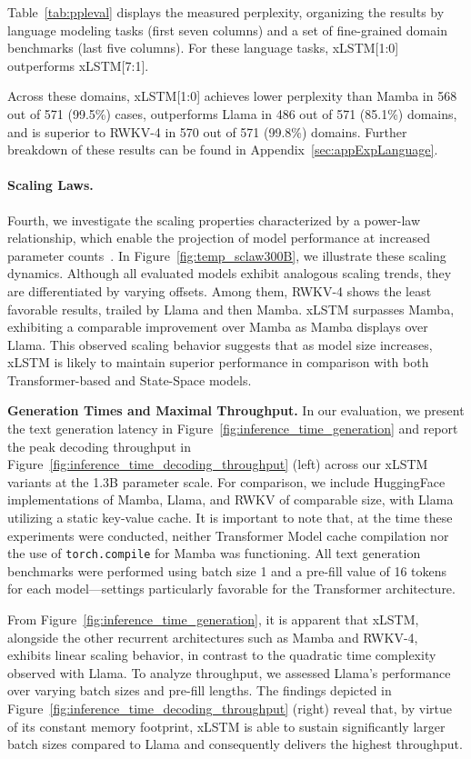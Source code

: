 Table~\ref{tab:ppleval} displays the measured perplexity, organizing the results by language modeling tasks (first seven columns) and a set of fine-grained domain benchmarks (last five columns). For these language tasks, xLSTM[1:0] outperforms xLSTM[7:1]. 

Across these domains, xLSTM[1:0] achieves lower perplexity than Mamba in 568 out of 571 (99.5\%) cases, outperforms Llama in 486 out of 571 (85.1\%) domains, and is superior to RWKV-4 in 570 out of 571 (99.8\%) domains. Further breakdown of these results can be found in Appendix~\ref{sec:appExpLanguage}.

\paragraph{Scaling Laws.} Fourth, we investigate the scaling properties characterized by a power-law relationship, which enable the projection of model performance at increased parameter counts~\citep{Kaplan:20,Brown:20short}. In Figure~\ref{fig:temp_sclaw300B}, we illustrate these scaling dynamics. Although all evaluated models exhibit analogous scaling trends, they are differentiated by varying offsets. Among them, RWKV-4 shows the least favorable results, trailed by Llama and then Mamba. xLSTM surpasses Mamba, exhibiting a comparable improvement over Mamba as Mamba displays over Llama. This observed scaling behavior suggests that as model size increases, xLSTM is likely to maintain superior performance in comparison with both Transformer-based and State-Space models.

\textbf{Generation Times and Maximal Throughput.} In our evaluation, we present the text generation latency in Figure~\ref{fig:inference_time_generation} and report the peak decoding throughput in Figure~\ref{fig:inference_time_decoding_throughput} (left) across our xLSTM variants at the 1.3B parameter scale. For comparison, we include HuggingFace implementations of Mamba, Llama, and RWKV of comparable size, with Llama utilizing a static key-value cache. It is important to note that, at the time these experiments were conducted, neither Transformer Model cache compilation nor the use of \texttt{torch.compile} for Mamba was functioning. All text generation benchmarks were performed using batch size 1 and a pre-fill value of 16 tokens for each model—settings particularly favorable for the Transformer architecture.

From Figure~\ref{fig:inference_time_generation}, it is apparent that xLSTM, alongside the other recurrent architectures such as Mamba and RWKV-4, exhibits linear scaling behavior, in contrast to the quadratic time complexity observed with Llama. To analyze throughput, we assessed Llama's performance over varying batch sizes and pre-fill lengths. The findings depicted in Figure~\ref{fig:inference_time_decoding_throughput} (right) reveal that, by virtue of its constant memory footprint, xLSTM is able to sustain significantly larger batch sizes compared to Llama and consequently delivers the highest throughput.

